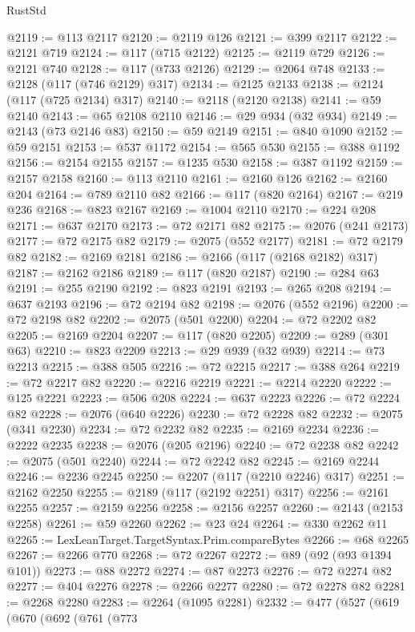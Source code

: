\begin{lexlean}{RustStd}
\begin{coremodule}
{\begin{coremodule}
{{{{{{{{{{{{{{{{{{{{{{{{{{{{{{{{{{{{{{{{{{{{{{{{{{{{{{{@2119 := @113 @2117
@2120 := @2119 @126
@2121 := @399 @2117
@2122 := @2121 @719
@2124 := @117 (@715 @2122)
@2125 := @2119 @729
@2126 := @2121 @740
@2128 := @117 (@733 @2126)
@2129 := @2064 @748
@2133 := @2128 (@117 (@746 @2129) @317)
@2134 := @2125 @2133
@2138 := @2124 (@117 (@725 @2134) @317)
@2140 := @2118 (@2120 @2138)
@2141 := @59 @2140
@2143 := @65 @2108 @2110
@2146 := @29 @934 (@32 @934)
@2149 := @2143 (@73 @2146 @83)
@2150 := @59 @2149
@2151 := @840 @1090
@2152 := @59 @2151
@2153 := @537 @1172
@2154 := @565 @530
@2155 := @388 @1192
@2156 := @2154 @2155
@2157 := @1235 @530
@2158 := @387 @1192
@2159 := @2157 @2158
@2160 := @113 @2110
@2161 := @2160 @126
@2162 := @2160 @204
@2164 := @789 @2110 @82
@2166 := @117 (@820 @2164)
@2167 := @219 @236
@2168 := @823 @2167
@2169 := @1004 @2110
@2170 := @224 @208
@2171 := @637 @2170
@2173 := @72 @2171 @82
@2175 := @2076 (@241 @2173)
@2177 := @72 @2175 @82
@2179 := @2075 (@552 @2177)
@2181 := @72 @2179 @82
@2182 := @2169 @2181
@2186 := @2166 (@117 (@2168 @2182) @317)
@2187 := @2162 @2186
@2189 := @117 (@820 @2187)
@2190 := @284 @63
@2191 := @255 @2190
@2192 := @823 @2191
@2193 := @265 @208
@2194 := @637 @2193
@2196 := @72 @2194 @82
@2198 := @2076 (@552 @2196)
@2200 := @72 @2198 @82
@2202 := @2075 (@501 @2200)
@2204 := @72 @2202 @82
@2205 := @2169 @2204
@2207 := @117 (@820 @2205)
@2209 := @289 (@301 @63)
@2210 := @823 @2209
@2213 := @29 @939 (@32 @939)
@2214 := @73 @2213
@2215 := @388 @505
@2216 := @72 @2215
@2217 := @388 @264
@2219 := @72 @2217 @82
@2220 := @2216 @2219
@2221 := @2214 @2220
@2222 := @125 @2221
@2223 := @506 @208
@2224 := @637 @2223
@2226 := @72 @2224 @82
@2228 := @2076 (@640 @2226)
@2230 := @72 @2228 @82
@2232 := @2075 (@341 @2230)
@2234 := @72 @2232 @82
@2235 := @2169 @2234
@2236 := @2222 @2235
@2238 := @2076 (@205 @2196)
@2240 := @72 @2238 @82
@2242 := @2075 (@501 @2240)
@2244 := @72 @2242 @82
@2245 := @2169 @2244
@2246 := @2236 @2245
@2250 := @2207 (@117 (@2210 @2246) @317)
@2251 := @2162 @2250
@2255 := @2189 (@117 (@2192 @2251) @317)
@2256 := @2161 @2255
@2257 := @2159 @2256
@2258 := @2156 @2257
@2260 := @2143 (@2153 @2258)
@2261 := @59 @2260
@2262 := @23 @24
@2264 := @330 @2262 @11
@2265 := LexLeanTarget.TargetSyntax.Prim.compareBytes
@2266 := @68 @2265
@2267 := @2266 @770
@2268 := @72 @2267
@2272 := @89 (@92 (@93 @1394 @101))
@2273 := @88 @2272
@2274 := @87 @2273
@2276 := @72 @2274 @82
@2277 := @404 @2276
@2278 := @2266 @2277
@2280 := @72 @2278 @82
@2281 := @2268 @2280
@2283 := @2264 (@1095 @2281)
@2332 := @477
    (@527
      (@619
        (@670
          (@692
            (@761
              (@773
}}}}}}}}}}}}}}}}}}}}}}}}}}}}}}}}}}}}}}}}}}}}}}}}}}}}}}}
\end{coremodule}}
\end{coremodule}
\end{lexlean}
